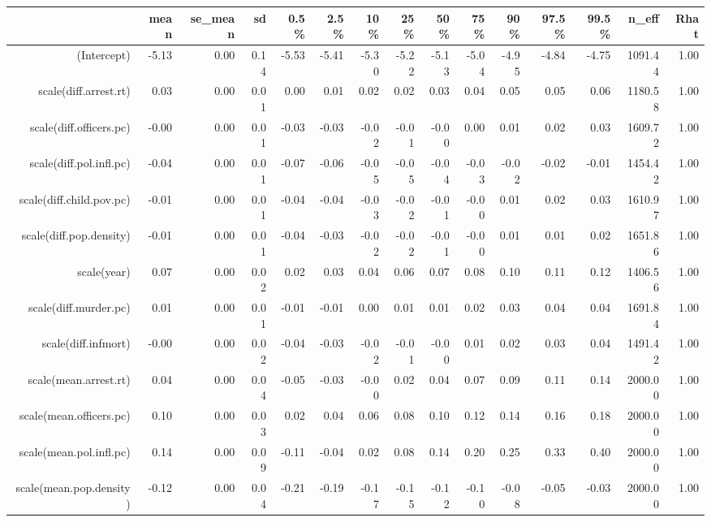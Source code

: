 \begin{table}[ht]
\centering
\begin{tabular}{rrrrrrrrrrrrrrr}
  \hline
 & mean & se\_mean & sd & 0.5\% & 2.5\% & 10\% & 25\% & 50\% & 75\% & 90\% & 97.5\% & 99.5\% & n\_eff & Rhat \\ 
  \hline
(Intercept) & -5.13 & 0.00 & 0.14 & -5.53 & -5.41 & -5.30 & -5.22 & -5.13 & -5.04 & -4.95 & -4.84 & -4.75 & 1091.44 & 1.00 \\ 
  scale(diff.arrest.rt) & 0.03 & 0.00 & 0.01 & 0.00 & 0.01 & 0.02 & 0.02 & 0.03 & 0.04 & 0.05 & 0.05 & 0.06 & 1180.58 & 1.00 \\ 
  scale(diff.officers.pc) & -0.00 & 0.00 & 0.01 & -0.03 & -0.03 & -0.02 & -0.01 & -0.00 & 0.00 & 0.01 & 0.02 & 0.03 & 1609.72 & 1.00 \\ 
  scale(diff.pol.infl.pc) & -0.04 & 0.00 & 0.01 & -0.07 & -0.06 & -0.05 & -0.05 & -0.04 & -0.03 & -0.02 & -0.02 & -0.01 & 1454.42 & 1.00 \\ 
  scale(diff.child.pov.pc) & -0.01 & 0.00 & 0.01 & -0.04 & -0.04 & -0.03 & -0.02 & -0.01 & -0.00 & 0.01 & 0.02 & 0.03 & 1610.97 & 1.00 \\ 
  scale(diff.pop.density) & -0.01 & 0.00 & 0.01 & -0.04 & -0.03 & -0.02 & -0.02 & -0.01 & -0.00 & 0.01 & 0.01 & 0.02 & 1651.86 & 1.00 \\ 
  scale(year) & 0.07 & 0.00 & 0.02 & 0.02 & 0.03 & 0.04 & 0.06 & 0.07 & 0.08 & 0.10 & 0.11 & 0.12 & 1406.56 & 1.00 \\ 
  scale(diff.murder.pc) & 0.01 & 0.00 & 0.01 & -0.01 & -0.01 & 0.00 & 0.01 & 0.01 & 0.02 & 0.03 & 0.04 & 0.04 & 1691.84 & 1.00 \\ 
  scale(diff.infmort) & -0.00 & 0.00 & 0.02 & -0.04 & -0.03 & -0.02 & -0.01 & -0.00 & 0.01 & 0.02 & 0.03 & 0.04 & 1491.42 & 1.00 \\ 
  scale(mean.arrest.rt) & 0.04 & 0.00 & 0.04 & -0.05 & -0.03 & -0.00 & 0.02 & 0.04 & 0.07 & 0.09 & 0.11 & 0.14 & 2000.00 & 1.00 \\ 
  scale(mean.officers.pc) & 0.10 & 0.00 & 0.03 & 0.02 & 0.04 & 0.06 & 0.08 & 0.10 & 0.12 & 0.14 & 0.16 & 0.18 & 2000.00 & 1.00 \\ 
  scale(mean.pol.infl.pc) & 0.14 & 0.00 & 0.09 & -0.11 & -0.04 & 0.02 & 0.08 & 0.14 & 0.20 & 0.25 & 0.33 & 0.40 & 2000.00 & 1.00 \\ 
  scale(mean.pop.density) & -0.12 & 0.00 & 0.04 & -0.21 & -0.19 & -0.17 & -0.15 & -0.12 & -0.10 & -0.08 & -0.05 & -0.03 & 2000.00 & 1.00 \\ 

\end{tabular}
\end{table}
